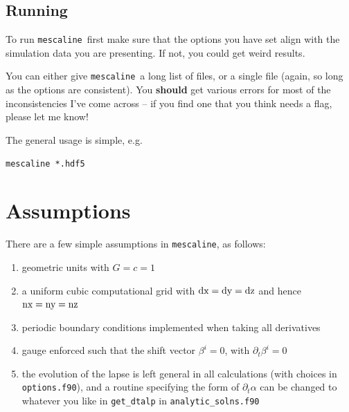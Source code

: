 \documentclass[a4paper]{article}
\newcommand{\alp}{\alpha}
\newcommand{\pd}{\partial}
\newcommand{\mesc}{\texttt{mescaline}}
\begin{document}
\subsection{Running}

To run \mesc\, first make sure that the options you have set align with the simulation data you are presenting. If not, you could get weird results. 

You can either give \mesc\, a long list of files, or a single file (again, so long as the options are consistent). You {\bf should} get various errors for most of the inconsistencies I've come across -- if you find one that you think needs a flag, please let me know!

The general usage is simple, e.g.

\vspace{2mm}
\texttt{mescaline *.hdf5}
\vspace{2mm}


\section{Assumptions}\label{sec:assumptions}

There are a few simple assumptions in \texttt{mescaline}, as follows:
\begin{enumerate}
	\item geometric units with $G=c=1$
	\item a uniform cubic computational grid with ${\rm dx = dy = dz}$ and hence ${\rm nx = ny = nz}$	
	\item periodic boundary conditions implemented when taking all derivatives
	\item gauge enforced such that the shift vector $\beta^i=0$, with $\pd_t \beta^i = 0$
	\item the evolution of the lapse is left general in all calculations (with choices in \texttt{options.f90}), and a routine specifying the form of $\pd_t \alp$ can be changed to whatever you like in \texttt{get\_dtalp} in \texttt{analytic\_solns.f90}
\end{enumerate}

\end{document}
